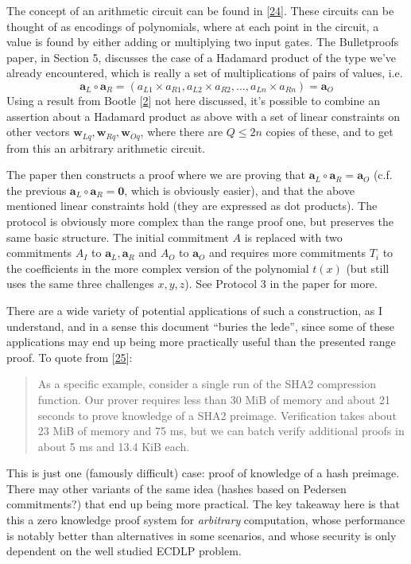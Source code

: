 \documentclass[10pt,a4paper]{article}
\begin{document}
The concept of an arithmetic circuit can be found in
{[}\protect\hyperlink{anchor-68}{24}{]}. These circuits can be thought
of as encodings of polynomials, where at each point in the circuit, a
value is found by either adding or multiplying two input gates. The
Bulletproofs paper, in Section 5, discusses the case of a Hadamard
product of the type we've already encountered, which is really a set of
multiplications of pairs of values, i.e.
\[\textbf{a}_L \circ \textbf{a}_R = (a_{L1} \times a_{R1}, a_{L2} \times a_{R2}, \ldots, a_{Ln} \times a_{Rn}) = \textbf{a}_O\]
Using a result from Bootle {[}\protect\hyperlink{anchor-8}{2}{]} not
here discussed, it's possible to combine an assertion about a Hadamard
product as above with a set of linear constraints on other vectors $\textbf{w}_{Lq}, \textbf{w}_{Rq},\textbf{w}_{Oq}$,
where there are $Q \le 2n$ copies of these, and to get from this an arbitrary
arithmetic circuit.

The paper then constructs a proof where we are proving that $\textbf{a}_L \circ \textbf{a}_R = \textbf{a}_O$ (c.f. the
previous $\textbf{a}_L \circ \textbf{a}_R = \textbf{0}$, which is obviously easier), and that the above mentioned
linear constraints hold (they are expressed as dot products). The
protocol is obviously more complex than the range proof one, but
preserves the same basic structure. The initial commitment $A$ is replaced
with two commitments $A_I$ to $\mathbf{a}_L, \mathbf{a}_R$ and $A_O$ to $\mathbf{a}_O$ and requires more commitments $T_i$ to the
coefficients in the more complex version of the polynomial $t(x)$ (but still
uses the same three challenges $x, y, z$). See Protocol 3 in the paper for more.

There are a wide variety of potential applications of such a
construction, as I understand, and in a sense this document ``buries the
lede'', since some of these applications may end up being more
practically useful than the presented range proof. To quote from
{[}\protect\hyperlink{anchor-69}{25}{]}:
\begin{quote}
As a specific example, consider a single run of the SHA2 compression
function. Our prover requires less than 30 MiB of memory and about 21
seconds to prove knowledge of a SHA2 preimage. Verification takes about
23 MiB of memory and 75 ms, but we can batch verify additional proofs in
about 5 ms and 13.4 KiB each.
\end{quote}

This is just one (famously difficult) case: proof of knowledge of a hash
preimage. There may other variants of the same idea (hashes based on
Pedersen commitments?) that end up being more practical. The key
takeaway here is that this a zero knowledge proof system for
\emph{arbitrary} computation, whose performance is notably better than
alternatives in some scenarios, and whose security is only dependent on
the well studied ECDLP problem.
\end{document}
